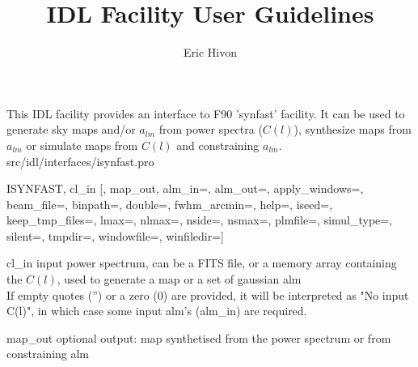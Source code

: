 
\sloppy

\title{\healpix IDL Facility User Guidelines}
 \section[isynfast]{ }
\label{idl:isynfast}
\author{Eric Hivon}

\begin{facility}
{This IDL facility provides an interface to F90 'synfast' facility. It can be
used to generate sky maps and/or $a_{lm}$ from power spectra ($C(l)$), synthesize maps from
$a_{lm}$ or simulate maps from $C(l)$ and constraining $a_{lm}$.}
{src/idl/interfaces/isynfast.pro}
\end{facility}

\begin{IDLformat}
{ISYNFAST, cl\_in [, map\_out,
      alm\_in=,  alm\_out=, apply\_windows=, beam\_file=, binpath=, double=, fwhm\_arcmin=, help=,
      iseed=, keep\_tmp\_files=, lmax=, nlmax=, nside=, nsmax=, plmfile=,
      simul\_type=, silent=, tmpdir=, windowfile=, winfiledir=]}
\end{IDLformat}

\begin{qualifiers}
  \begin{qulist}{} %
   \item[cl\_in] input power spectrum, can be a FITS file, or a memory array containing the
        $C(l)$, used to generate a map or a set of gaussian alm \\
   If empty quotes ('') or a zero (0) are provided, it will be interpreted as "No input C(l)", in
   which case some input alm's (alm\_in) are required.
    \item[map\_out] optional output: map synthetised from the power spectrum or from constraining alm
  \end{qulist}
\end{qualifiers}

